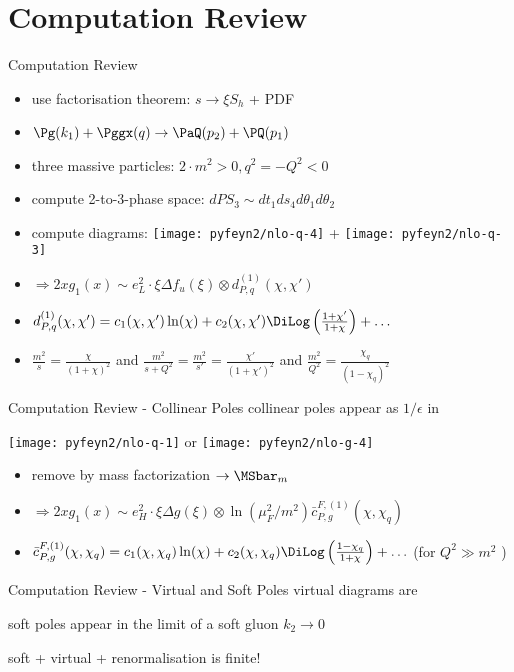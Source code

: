 \section{Computation Review}
\begin{frame}{Computation Review}
\begin{itemize}
\item use factorisation theorem: $s\to \xi S_h$ + PDF
\item $\Pg(k_1) + \Pggx(q) \to \PaQ(p_2) + \PQ(p_1)$
\item three massive particles: $2\cdot m^2>0,q^2=-Q^2<0$
\item compute 2-to-3-phase space: $dPS_3 \sim dt_1ds_4d\theta_1d\theta_2$
\item compute diagrams: \texttt{[image: pyfeyn2/nlo-q-4]} + \texttt{[image: pyfeyn2/nlo-q-3]}
\item $\Rightarrow 2xg_1(x) \sim e_L^2\cdot \xi\Delta f_u(\xi) \otimes d_{P,q}^{(1)}(\chi,\chi')$
\item $d_{P,q}^{(1)}(\chi,\chi') = c_1(\chi,\chi')\ln(\chi) + c_2(\chi,\chi')\DiLog\left(\frac{1+\chi'}{1+\chi}\right)+\ldots$ \checkmark
\item $\frac{m^2}{s} = \frac{\chi}{(1+\chi)^2}$ and $\frac{m^2}{s+Q^2} = \frac{m^2}{s'} = \frac{\chi'}{(1+\chi')^2}$ and $\frac{m^2}{Q^2} = \frac{\chi_q}{(1-\chi_q)^2}$
\end{itemize}
\end{frame}

\begin{frame}{Computation Review - Collinear Poles}
collinear poles appear as $1/\epsilon$ in

\texttt{[image: pyfeyn2/nlo-q-1]} or \texttt{[image: pyfeyn2/nlo-g-4]}

\begin{itemize}
\item remove by mass factorization $\to \MSbar_m$
\item $\Rightarrow 2xg_1(x) \sim e_H^2\cdot \xi\Delta g(\xi) \otimes \ln(\mu_F^2/m^2) \bar c_{P,g}^{F,(1)}(\chi,\chi_q)$
\item $\bar c_{P,g}^{F,(1)}(\chi,\chi_q) = c_1(\chi,\chi_q)\ln(\chi) + c_2(\chi,\chi_q)\DiLog\left(\frac{1-\chi_q}{1+\chi}\right) + \ldots$ (\checkmark for $Q^2\gg m^2$ )
\end{itemize}
\end{frame}


\begin{frame}{Computation Review - Virtual and Soft Poles}
virtual diagrams are


soft poles appear in the limit of a soft gluon $k_2\rightarrow 0$


soft + virtual + renormalisation is finite!
\end{frame}
